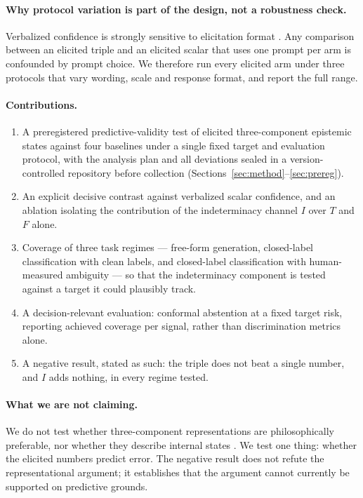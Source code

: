 \documentclass[11pt]{article}
\begin{document}
\paragraph{Why protocol variation is part of the design, not a robustness check.}
Verbalized confidence is strongly sensitive to elicitation format
\citep{tian2023just,xiong2024can,protocolsens2026}. Any comparison between an elicited triple and
an elicited scalar that uses one prompt per arm is confounded by prompt choice. We therefore run
every elicited arm under three protocols that vary wording, scale and response format, and report
the full range.

\paragraph{Contributions.}
\begin{enumerate}
  \item A preregistered predictive-validity test of elicited three-component epistemic states
        against four baselines under a single fixed target and evaluation protocol, with the
        analysis plan and all deviations sealed in a version-controlled repository before
        collection (Sections~\ref{sec:method}--\ref{sec:prereg}).
  \item An explicit decisive contrast against verbalized scalar confidence, and an ablation
        isolating the contribution of the indeterminacy channel $I$ over $T$ and $F$ alone.
  \item Coverage of three task regimes --- free-form generation, closed-label classification
        with clean labels, and closed-label classification with human-measured ambiguity ---
        so that the indeterminacy component is tested against a target it could plausibly track.
  \item A decision-relevant evaluation: conformal abstention at a fixed target risk, reporting
        achieved coverage per signal, rather than discrimination metrics alone.
  \item A negative result, stated as such: the triple does not beat a single number, and $I$
        adds nothing, in every regime tested.
\end{enumerate}

\paragraph{What we are not claiming.} We do not test whether three-component representations
are philosophically preferable, nor whether they describe internal states
\citep{mason2026observability}. We test one thing: whether the elicited numbers predict error.
The negative result does not refute the representational argument; it establishes that the
argument cannot currently be supported on predictive grounds.
\end{document}
